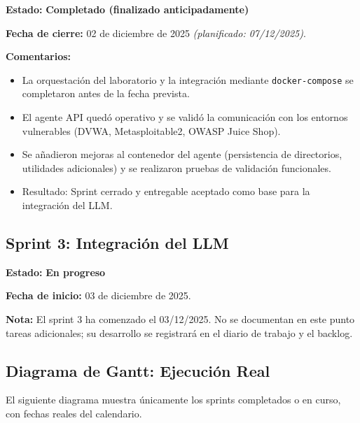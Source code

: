 \documentclass[12pt,a4paper]{article}
\begin{document}
\textbf{Estado:} \textcolor{early}{\textbf{Completado (finalizado anticipadamente)}}

\textbf{Fecha de cierre:} 02 de diciembre de 2025 \textit{(planificado: 07/12/2025)}.

\textbf{Comentarios:}
\begin{itemize}
    \item La orquestación del laboratorio y la integración mediante \texttt{docker-compose} se completaron antes de la fecha prevista.
    \item El agente API quedó operativo y se validó la comunicación con los entornos vulnerables (DVWA, Metasploitable2, OWASP Juice Shop).
    \item Se añadieron mejoras al contenedor del agente (persistencia de directorios, utilidades adicionales) y se realizaron pruebas de validación funcionales.
    \item Resultado: Sprint cerrado y entregable aceptado como base para la integración del LLM.
\end{itemize}

\subsection{Sprint 3: Integración del LLM}

\textbf{Estado:} \textcolor{inprogress}{\textbf{En progreso}}

\textbf{Fecha de inicio:} 03 de diciembre de 2025.

\textbf{Nota:} El sprint 3 ha comenzado el 03/12/2025. No se documentan en este punto tareas adicionales; su desarrollo se registrará en el diario de trabajo y el backlog.

\subsection{Diagrama de Gantt: Ejecución Real}

El siguiente diagrama muestra únicamente los sprints completados o en curso, con fechas reales del calendario.
\end{document}
